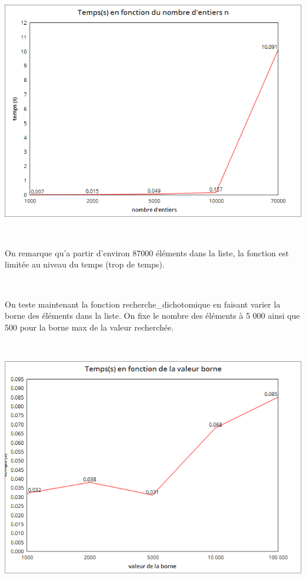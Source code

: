 \documentclass[a4paper, 12pt]{article}
\begin{document}
~
\begin{center}
\includegraphics[scale=0.25]{recherchedichoN.png}
\end{center}
~

On remarque qu'a partir d'environ 87000 éléments dans la liste, la fonction est limitée au niveau du temps (trop de temps).

~

On teste maintenant la fonction recherche\_dichotomique en faisant varier la borne des éléments dans la liste. On fixe le nombre des éléments à 5 000 ainsi que 500 pour la borne max de la valeur recherchée.

~
\begin{center}
\includegraphics[scale=0.25]{recherchedichoM.png}
\end{center}
~
\end{document}
